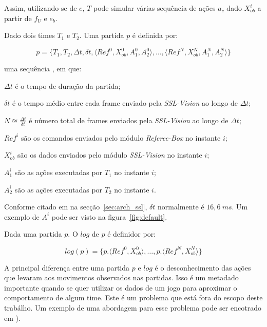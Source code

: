   Assim, utilizando-se de $e$, $T$ pode simular várias sequência de ações $a_c$ dado $X_{ob}^{i}$
  a partir de $f_{U}$ e $e_b$.

\begin{defi}[Partida]
  Dado dois times $T_1$ e $T_2$. Uma partida $p$ é definida por:

  \[
   p = \lbrace T_1, T_2, \Delta t, \delta t, \langle Ref^{0}, X_{ob}^{0}, A_1^{0}, A_2^{0}\rangle, 
    \dots, \langle Ref^{N}, X_{ob}^{N}, A_1^{N}, A_2^{N} \rangle \rbrace
 \]

  uma sequência , em que:
  \begin{description}
    \item $\Delta t$ é o tempo de duração da partida;
    \item $\delta t$ é o tempo médio entre cada frame enviado pela \textit{SSL-Vision} ao longo de $\Delta t$;
    \item $N \approxeq \frac{\Delta t}{\delta t}$ é número total de frames enviados pela \textit{SSL-Vision}
  ao longo de $\Delta t$;
    \item $Ref^{i}$ são os comandos enviados pelo módulo \textit{Referee-Box} no instante $i$;
    \item $X_{ob}^{i}$ são os dados enviados pelo módulo \textit{SSL-Vision} no instante $i$;
    \item $A_1^{i}$ são as ações executadas por $T_1$ no instante $i$;
    \item $A_2^{i}$ são as ações executadas por $T_2$ no instante $i$.
  \end{description}
\end{defi}

  Conforme citado em na secção~\ref{sec:arch_ssl}, $\delta t$ normalmente é $16,6{\ }ms$.
  Um exemplo de $A^{i}$ pode ser visto na figura~\ref{fig:default}.

\begin{defi}[Logs]
  Dada uma partida $p$. O $log$ de $p$ é definidor por:

  \[
    log(p) = \lbrace p.\langle Ref^{0}, X_{ob}^{0}\rangle, \dots, p.\langle Ref^{N}, X_{ob}^{N}\rangle \rbrace
  \]
 
  A principal diferença entre uma partida $p$ e $log$ é o desconhecimento das ações que levaram
  aos movimentos observados nas partidas. Isso é um metadado importante quando se quer utilizar
  os dados de um jogo para aproximar o comportamento de algum time. Este é um problema que está
  fora do escopo deste trabálho. Um exemplo de uma abordagem para esse problema pode ser encotrado
  em \cite{vail2008crf}).
\end{defi}
